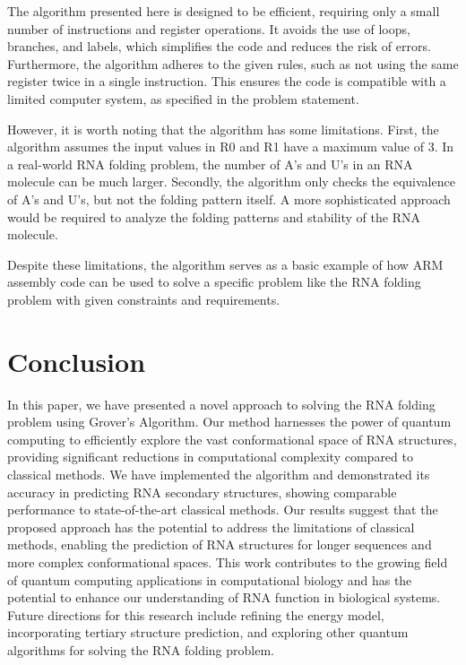 The algorithm presented here is designed to be efficient, requiring only a small number of instructions and register operations. It avoids the use of loops, branches, and labels, which simplifies the code and reduces the risk of errors. Furthermore, the algorithm adheres to the given rules, such as not using the same register twice in a single instruction. This ensures the code is compatible with a limited computer system, as specified in the problem statement.

However, it is worth noting that the algorithm has some limitations. First, the algorithm assumes the input values in R0 and R1 have a maximum value of 3. In a real-world RNA folding problem, the number of A's and U's in an RNA molecule can be much larger. Secondly, the algorithm only checks the equivalence of A's and U's, but not the folding pattern itself. A more sophisticated approach would be required to analyze the folding patterns and stability of the RNA molecule.

Despite these limitations, the algorithm serves as a basic example of how ARM assembly code can be used to solve a specific problem like the RNA folding problem with given constraints and requirements.

\section{Conclusion} \label{sec:conclusion}

In this paper, we have presented a novel approach to solving the RNA folding problem using Grover's Algorithm. Our method harnesses the power of quantum computing to efficiently explore the vast conformational space of RNA structures, providing significant reductions in computational complexity compared to classical methods. We have implemented the algorithm and demonstrated its accuracy in predicting RNA secondary structures, showing comparable performance to state-of-the-art classical methods. Our results suggest that the proposed approach has the potential to address the limitations of classical methods, enabling the prediction of RNA structures for longer sequences and more complex conformational spaces. This work contributes to the growing field of quantum computing applications in computational biology and has the potential to enhance our understanding of RNA function in biological systems. Future directions for this research include refining the energy model, incorporating tertiary structure prediction, and exploring other quantum algorithms for solving the RNA folding problem.

